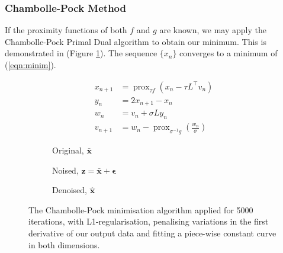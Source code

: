 \documentclass[12pt]{article}
\begin{document}
\subsubsection{Chambolle-Pock Method}
If the proximity functions of both $f$ and $g$ are known, we may apply the Chambolle-Pock Primal Dual algorithm\cite{chambolle-pock}\cite{chambolle-pock-2} to obtain our minimum. This is demonstrated in (Figure \ref{fig:chambolle-pock}). The sequence $\{x_n\}$ converges to a minimum of (\ref{eqn:minim}).


\begin{align}
    x_{n+1} &=\operatorname{prox}_{\tau f}\left(x_{n} - \tau L^{\top} v_{n}\right) \\
    y_{n} &= 2x_{n+1}-x_{n} \\
    w_{n} &= v_{n}+\sigma L y_{n} \\
    v_{n+1} &= w_{n} - \operatorname{prox}_{\sigma^{-1} g}\left(\frac{w_n}{\sigma}\right)
\end{align}



\begin{figure}[H]
    \centering
    \begin{subfigure}[t]{0.32\textwidth}
        \centering
        \caption{Original, $\bm{\bar{x}}$}
    \end{subfigure}
    \begin{subfigure}[t]{0.32\textwidth}
        \centering
        \caption{Noised, $\bm{z} = \bm{\bar{x}} + \bm{\epsilon}$}
    \end{subfigure}
    \begin{subfigure}[t]{0.32\textwidth}
        \centering
        \caption{Denoised, $\bm{\hat{x}}$}
    \end{subfigure}
    \caption{The Chambolle-Pock minimisation algorithm applied for 5000 iterations, with L1-regularisation, penalising variations in the first derivative of our output data and fitting a piece-wise constant curve in both dimensions.}
    \label{fig:chambolle-pock}
\end{figure}
\end{document}
